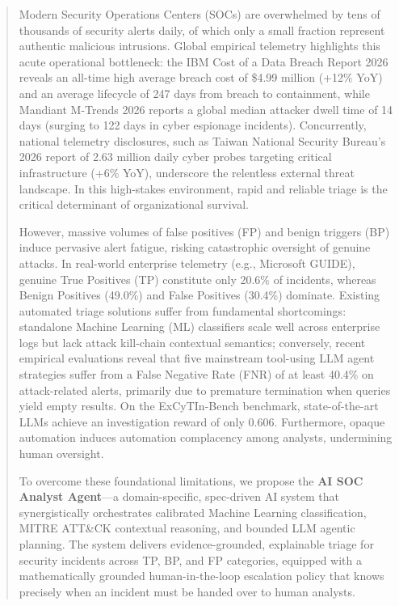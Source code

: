 \begin{abstract}
Modern Security Operations Centers (SOCs) are overwhelmed by tens of thousands of security alerts daily, of which only a small fraction represent authentic malicious intrusions. Global empirical telemetry highlights this acute operational bottleneck: the IBM Cost of a Data Breach Report 2026 reveals an all-time high average breach cost of \$4.99 million (+12\% YoY) and an average lifecycle of 247 days from breach to containment, while Mandiant M-Trends 2026 reports a global median attacker dwell time of 14 days (surging to 122 days in cyber espionage incidents). Concurrently, national telemetry disclosures, such as Taiwan National Security Bureau's 2026 report of 2.63 million daily cyber probes targeting critical infrastructure (+6\% YoY), underscore the relentless external threat landscape. In this high-stakes environment, rapid and reliable triage is the critical determinant of organizational survival.

However, massive volumes of false positives (FP) and benign triggers (BP) induce pervasive alert fatigue, risking catastrophic oversight of genuine attacks. In real-world enterprise telemetry (e.g., Microsoft GUIDE), genuine True Positives (TP) constitute only 20.6\% of incidents, whereas Benign Positives (49.0\%) and False Positives (30.4\%) dominate. Existing automated triage solutions suffer from fundamental shortcomings: standalone Machine Learning (ML) classifiers scale well across enterprise logs but lack attack kill-chain contextual semantics; conversely, recent empirical evaluations reveal that five mainstream tool-using LLM agent strategies suffer from a False Negative Rate (FNR) of at least 40.4\% on attack-related alerts, primarily due to premature termination when queries yield empty results. On the ExCyTIn-Bench benchmark, state-of-the-art LLMs achieve an investigation reward of only 0.606. Furthermore, opaque automation induces automation complacency among analysts, undermining human oversight.

To overcome these foundational limitations, we propose the \textbf{AI SOC Analyst Agent}---a domain-specific, spec-driven AI system that synergistically orchestrates calibrated Machine Learning classification, MITRE ATT\&CK contextual reasoning, and bounded LLM agentic planning. The system delivers evidence-grounded, explainable triage for security incidents across TP, BP, and FP categories, equipped with a mathematically grounded human-in-the-loop escalation policy that knows precisely when an incident must be handed over to human analysts.


\end{abstract}
